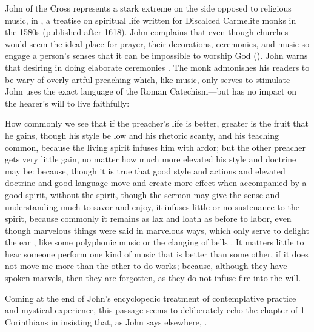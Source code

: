 John of the Cross represents a stark extreme on the side opposed to religious
music, in , a treatise on spiritual life 
written for Discalced Carmelite monks in the 1580s (published after 1618).
John complains that even though churches would seem the ideal place for prayer,
their decorations, ceremonies, and music so engage a person's senses that it can
be impossible to worship God 
().%
    \Autocite
    [, , ]
    {JuandelaCruz:Subida}
John warns that desiring  in doing
elaborate ceremonies .%
    \Autocite
    [, , ]
    {JuandelaCruz:Subida}
The monk admonishes his readers to be wary of overly artful preaching which,
like music, only serves to stimulate ---John
uses the exact language of the Roman Catechism---but has no impact on the
hearer's will to live faithfully:
\begin{quoting}
    How commonly we see that \Dots{} if the preacher's life is better, greater
    is the fruit that he gains, though his style be low and his rhetoric scanty,
    and his teaching common, because the living spirit infuses him with ardor;
    but the other preacher gets very little gain, no matter how much more
    elevated his style and doctrine may be: because, though it is true that good
    style and actions and elevated doctrine and good language move and create
    more effect when accompanied by a good spirit, without the spirit, though
    the sermon may give the sense and understanding much to savor and enjoy, it
    infuses little or no sustenance to the spirit, because commonly it remains
    as lax and loath as before to labor, even though marvelous things were said
    in marvelous ways, which only serve to delight the ear , like
    some polyphonic music  or the clanging of
    bells \Dots{}.
    It matters little to hear someone perform one kind of music that is better
    than some other, if it does not move me more than the other to do works;
    because, although they have spoken marvels, then they are forgotten, as they
    do not infuse fire into the will.%
        \Autocite
        [, , ]
        {JuandelaCruz:Subida}
\end{quoting}
Coming at the end of John's encyclopedic treatment of contemplative practice and
mystical experience, this passage seems to deliberately echo the 
chapter of 1 Corinthians in insisting that, as John says elsewhere, .%
    \Autocite
    [, , ]
    {JuandelaCruz:Subida}

